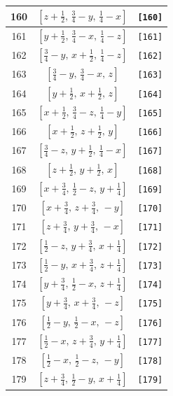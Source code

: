 \documentclass[fleqn,8pt]{jsarticle}
\begin{document}
\begin{longtable}{ccc}
160 & $\left[ z + \frac{1}{2},\, \frac{3}{4} - y,\, \frac{1}{4} - x \right]$ & {\tt [160]} \\ \hline
161 & $\left[ y + \frac{1}{2},\, \frac{3}{4} - x,\, \frac{1}{4} - z \right]$ & {\tt [161]} \\ \hline
162 & $\left[ \frac{3}{4} - y,\, x + \frac{1}{2},\, \frac{1}{4} - z \right]$ & {\tt [162]} \\ \hline
163 & $\left[ \frac{3}{4} - y,\, \frac{3}{4} - x,\, z \right]$ & {\tt [163]} \\ \hline
164 & $\left[ y + \frac{1}{2},\, x + \frac{1}{2},\, z \right]$ & {\tt [164]} \\ \hline
165 & $\left[ x + \frac{1}{2},\, \frac{3}{4} - z,\, \frac{1}{4} - y \right]$ & {\tt [165]} \\ \hline
166 & $\left[ x + \frac{1}{2},\, z + \frac{1}{2},\, y \right]$ & {\tt [166]} \\ \hline
167 & $\left[ \frac{3}{4} - z,\, y + \frac{1}{2},\, \frac{1}{4} - x \right]$ & {\tt [167]} \\ \hline
168 & $\left[ z + \frac{1}{2},\, y + \frac{1}{2},\, x \right]$ & {\tt [168]} \\ \hline
169 & $\left[ x + \frac{3}{4},\, \frac{1}{2} - z,\, y + \frac{1}{4} \right]$ & {\tt [169]} \\ \hline
170 & $\left[ x + \frac{3}{4},\, z + \frac{3}{4},\, - y \right]$ & {\tt [170]} \\ \hline
171 & $\left[ z + \frac{3}{4},\, y + \frac{3}{4},\, - x \right]$ & {\tt [171]} \\ \hline
172 & $\left[ \frac{1}{2} - z,\, y + \frac{3}{4},\, x + \frac{1}{4} \right]$ & {\tt [172]} \\ \hline
173 & $\left[ \frac{1}{2} - y,\, x + \frac{3}{4},\, z + \frac{1}{4} \right]$ & {\tt [173]} \\ \hline
174 & $\left[ y + \frac{3}{4},\, \frac{1}{2} - x,\, z + \frac{1}{4} \right]$ & {\tt [174]} \\ \hline
175 & $\left[ y + \frac{3}{4},\, x + \frac{3}{4},\, - z \right]$ & {\tt [175]} \\ \hline
176 & $\left[ \frac{1}{2} - y,\, \frac{1}{2} - x,\, - z \right]$ & {\tt [176]} \\ \hline
177 & $\left[ \frac{1}{2} - x,\, z + \frac{3}{4},\, y + \frac{1}{4} \right]$ & {\tt [177]} \\ \hline
178 & $\left[ \frac{1}{2} - x,\, \frac{1}{2} - z,\, - y \right]$ & {\tt [178]} \\ \hline
179 & $\left[ z + \frac{3}{4},\, \frac{1}{2} - y,\, x + \frac{1}{4} \right]$ & {\tt [179]} \\ \hline

\end{longtable}
\end{document}
